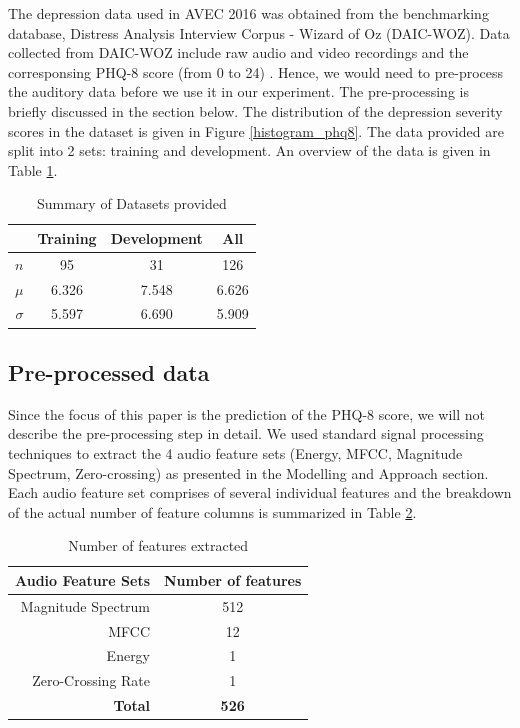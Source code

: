 \documentclass{article}
\begin{document}
	The depression data used in AVEC 2016 was obtained from the benchmarking database, Distress Analysis Interview Corpus - Wizard of Oz (DAIC-WOZ). 
	Data collected from DAIC-WOZ include raw audio and video recordings and the corresponsing PHQ-8 score (from 0 to 24) \cite{jad2008}. Hence, we would 
	need to pre-process the auditory data before we use it in our experiment. The pre-processing is briefly discussed in the section below.
	The distribution of the depression severity scores in the dataset is given in Figure \ref{histogram_phq8}. 
	The data provided are split into 2 sets: training and development.
	An overview of the data is given in Table \ref{summary_table}.

 	\begin{table}[h]
 		\begin{center}
  			\begin{tabular}{ | r | c | c | c | }
    			\hline
			 		& \bfseries Training	& \bfseries Development 	& \bfseries All \\ \hline
			 $n$		& 95 			& 31 				& 126 \\ \hline
			 $\mu$	& 6.326 		& 7.548			& 6.626 \\ \hline
			 $\sigma$	& 5.597 		& 6.690 			& 5.909 \\ \hline
			 \end{tabular}
		\end{center}
 	\caption{Summary of Datasets provided}
 	\label{summary_table}
 	\end{table}

	\subsection{Pre-processed data}
	Since the focus of this paper is the prediction of the PHQ-8 score, we will not describe the pre-processing step in detail.
	We used standard signal processing techniques to extract the 4 audio feature sets (Energy, MFCC, Magnitude Spectrum, Zero-crossing) as presented in the Modelling 
	and Approach section.
	Each audio feature set comprises of several individual features and the breakdown of the actual number of feature columns is summarized in Table \ref{no_features}.

 	\begin{table}[h]
 		\begin{center}
  			\begin{tabular}{ | r | c | }
    			\hline
			 \bfseries Audio Feature Sets 	& \bfseries Number of features \\ \hline
			 Magnitude Spectrum		& 512 \\ \hline
			 MFCC 				& 12 \\ \hline
			 Energy 				& 1 \\ \hline
			 Zero-Crossing Rate 		& 1 \\ \hline
			 \bfseries Total			& \bfseries 526 \\ \hline
			 \end{tabular}
		\end{center}
 	\caption{Number of features extracted}
 	\label{no_features}
 	\end{table}
\end{document}
